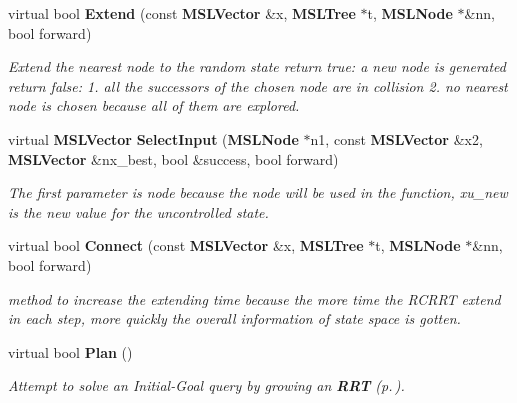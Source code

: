 \begin{CompactItemize}
virtual bool {\bf Extend} (const {\bf MSLVector} \&x, {\bf MSLTree} $\ast$t, {\bf MSLNode} $\ast$\&nn, bool forward)
\begin{CompactList}\small\item\em Extend the nearest node to the random state return true: a new node is generated return false: 1. all the successors of the chosen node are in collision 2. no nearest node is chosen because all of them are explored.\item\end{CompactList}\item 
virtual {\bf MSLVector} {\bf Select\-Input} ({\bf MSLNode} $\ast$n1, const {\bf MSLVector} \&x2, {\bf MSLVector} \&nx\_\-best, bool \&success, bool forward)
\begin{CompactList}\small\item\em The first parameter is node because the node will be used in the function, xu\_\-new is the new value for the uncontrolled state.\item\end{CompactList}\item 
virtual bool {\bf Connect} (const {\bf MSLVector} \&x, {\bf MSLTree} $\ast$t, {\bf MSLNode} $\ast$\&nn, bool forward)
\begin{CompactList}\small\item\em method to increase the extending time because the more time the RCRRT extend in each step, more quickly the overall information of state space is gotten.\item\end{CompactList}\item 
virtual bool {\bf Plan} ()
\begin{CompactList}\small\item\em Attempt to solve an Initial-Goal query by growing an {\bf RRT} {\rm (p.\,\pageref{classRRT})}.\item\end{CompactList}\end{CompactItemize}
